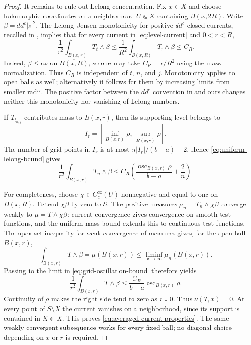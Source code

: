 \documentclass[11pt]{amsart}
\theoremstyle{definition}
\theoremstyle{remark}
\numberwithin{equation}{section}
\newcommand{\ddc}{dd^c}
\begin{document}
\begin{proof}
It remains to rule out Lelong concentration.  Fix $x\in X$ and
choose holomorphic coordinates on a neighborhood $U\Subset X$
containing $\overline{B(x,2R)}$.  Write
$\beta=\ddc|z|^2$.  The Lelong--Jensen monotonicity for positive
$dd^c$-closed currents, recalled in
\cite[Appendix~B, equations~(B.1)--(B.2)]{DNS22}, implies that for
every current in \eqref{eq:level-current} and $0<r<R$,
\begin{equation}
\label{eq:uniform-lelong-bound}
 \frac{1}{r^2}\int_{B(x,r)}T_t\wedge\beta
 \leq\frac{1}{R^2}\int_{B(x,R)}T_t\wedge\beta
 \leq C_R.
\end{equation}
Indeed, $\beta\leq c\omega$ on $\overline{B(x,R)}$, so one may
take $C_R=c/R^2$ using the mass normalization.  Thus $C_R$ is
independent of $t$, $n$, and $j$.  Monotonicity applies to open
balls as well; alternatively it follows for them by increasing
limits from smaller radii.  The positive factor between the
$dd^c$ convention in \cite{DNS22} and ours changes neither this
monotonicity nor vanishing of Lelong numbers.

If $T_{t_{n,j}}$ contributes mass to $B(x,r)$, then its supporting
level belongs to
\[
 I_r=\left[\inf_{B(x,r)}\rho,\ \sup_{B(x,r)}\rho\right].
\]
The number of grid points in $I_r$ is at most
$n|I_r|/(b-a)+2$.  Hence \eqref{eq:uniform-lelong-bound} gives
\begin{equation}
\label{eq:grid-oscillation-bound}
 \frac{1}{r^2}\int_{B(x,r)}T_n\wedge\beta
 \leq C_R\left(
       \frac{\operatorname{osc}_{B(x,r)}\rho}{b-a}+\frac2n
             \right).
\end{equation}

For completeness, choose $\chi\in C_c^\infty(U)$ nonnegative and
equal to one on $B(x,R)$.  Extend $\chi\beta$ by zero to $S$.
The positive measures $\mu_n=T_n\wedge\chi\beta$ converge weakly
to $\mu=T\wedge\chi\beta$: current convergence gives convergence
on smooth test functions, and the uniform mass bound extends this
to continuous test functions.  The open-set inequality for weak
convergence of measures gives, for the open ball $B(x,r)$,
\[
 \int_{B(x,r)}T\wedge\beta
   =\mu(B(x,r))
   \leq\liminf_{n\to\infty}\mu_n(B(x,r)).
\]
Passing to the limit in \eqref{eq:grid-oscillation-bound} therefore
yields
\begin{equation}
\label{eq:limit-oscillation-bound}
 \frac{1}{r^2}\int_{B(x,r)}T\wedge\beta
 \leq \frac{C_R}{b-a}\operatorname{osc}_{B(x,r)}\rho.
\end{equation}
Continuity of $\rho$ makes the right side tend to zero as
$r\downarrow0$.  Thus $\nu(T,x)=0$.  At every point of $S\setminus X$
the current vanishes on a neighborhood, since its support is contained
in $K\Subset X$.  This proves \eqref{eq:averaged-current-properties}.
The same weakly convergent subsequence works for every fixed ball;
no diagonal choice depending on $x$ or $r$ is required.
\end{proof}
\end{document}
